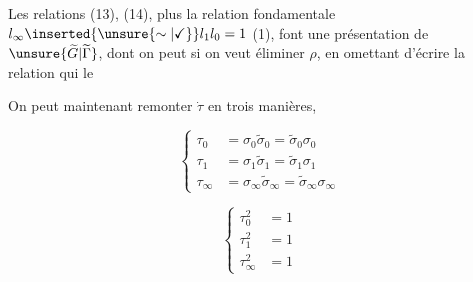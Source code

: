 Les relations (13), (14), plus la relation fondamentale $l_\infty\inserted{\unsure{\sim|\checkmark}}l_1l_0=1$ (1), font une présentation de $\unsure{\widetilde G|\widetilde\Gamma}$, dont on peut si on veut éliminer $\rho$, en omettant d'écrire la relation qui le 

On peut maintenant remonter $\dot\tau$ en trois manières,  

\[
\left\{\begin{aligned}
\tau_0&=\sigma_0\widetilde\sigma_0=\widetilde\sigma_0\sigma_0\\
\tau_1&=\sigma_1\widetilde\sigma_1=\widetilde\sigma_1\sigma_1\\
\tau_\infty&=\sigma_\infty\widetilde\sigma_\infty=\widetilde\sigma_\infty\sigma_\infty
\end{aligned}\right. \tag*{(15)}
\]


\[
\left\{\begin{aligned}
\tau_0^2&=1\\
\tau_1^2&=1\\
\tau_\infty^2&=1
\end{aligned}\right. \tag*{(16)}
\]
